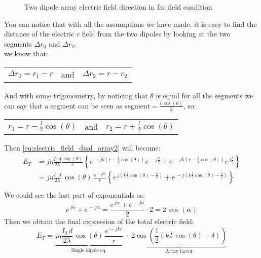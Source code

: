 \begin{figure}[H]
\begin{center}
\begin{tikzpicture}[scale=5,tdplot_main_coords]
            
        \end{tikzpicture}
    \end{center} \caption{Two dipole array electric field direction in far field condition}\label{fig:Two_dipole_array_example_far_field} 
\end{figure}
You can notice that with all the assumptions we have made, it is easy to find the distance of the electric $r$ field from the two dipoles by looking at the two segments $\Delta r_0$ and $\Delta r_2$.\\
we know that:
\begin{center}
    \begin{tabular}{ c c c }
        $\Delta r_0=r_1-r$&
        and&
        $\Delta r_2=r-r_2$
    \end{tabular}
\end{center}
And with some trigonometry, by noticing that $\theta$ is equal for all the segments we can say that a segment can be seen as $\text{segment}=\frac{l\,\cos(\theta)}{2}$, so:
\begin{center}
    \begin{tabular}{ c c c }
        $r_1=r-\frac{l}{2}\cos(\theta)$&
        and&
        $r_2=r+\frac{l}{2}\cos(\theta)$
    \end{tabular}
\end{center}
Then \cref{eq:electric_field_dual_array2} will become:
\begin{align}
    \begin{split}
        E_T&=j\eta\frac{I_0\,d}{2\lambda}\frac{\cos(\theta)}{r}\left\{e^{\,-jk(r-\frac{l}{2}\cos(\theta))}e^{\,-j\frac{\delta}{2}}+e^{\,-jk(r-\frac{l}{2}\cos(\theta))}e^{\,j\frac{\delta}{2}}\right\}\\[5pt]
        &=j\eta\frac{I_0\,d}{2\lambda}\,\cos(\theta)\,\frac{e^{\,-jkr}}{r}\left\{e^{\,j(k\frac{l}{2}\cos(\theta)-\frac{\delta}{2})}+e^{\,-j(k\frac{l}{2}\cos(\theta)-\frac{\delta}{2})}\right\}\\[5pt]
    \end{split}
\end{align}
We could see the last part of exponentials as:
\begin{equation}
    e^{\,j\alpha}+e^{\,-j\alpha}=\frac{e^{\,j\alpha}+e^{\,-j\alpha}}{2}\cdot 2=2\,\cos(\alpha)    
\end{equation}
Then we obtain the final expression of the total electric field:
\begin{equation}\label{eq:electric_field_dual_array3}
    E_T=\underbrace{j\eta\frac{I_0\,d}{2\lambda}\,\cos(\theta)\,\frac{e^{\,-jkr}}{r}}_{\text{Single dipole eq.}}\;\cdot\;\underbrace{2\cos\left(\frac{1}{2}(k\,l\,\cos(\theta)-\delta)\right)}_{\text{Array factor}}
\end{equation}

